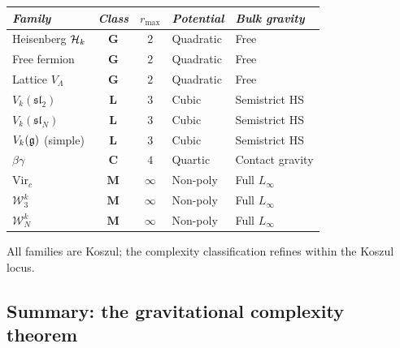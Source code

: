 \begin{theorem}
\ClaimStatusProvedHere
{}
\begin{center}
\small
\renewcommand{\arraystretch}{1.3}
\begin{tabular}{l@{\quad}c@{\quad}c@{\quad}l@{\quad}l}
\toprule
\emph{Family} & \emph{Class} & $r_{\max}$ &
 \emph{Potential} &
 \emph{Bulk gravity} \\
\midrule
Heisenberg $\mathcal{H}_k$ &
 $\mathbf{G}$ & $2$ & Quadratic & Free \\
Free fermion &
 $\mathbf{G}$ & $2$ & Quadratic & Free \\
Lattice $V_\Lambda$ &
 $\mathbf{G}$ & $2$ & Quadratic & Free \\[3pt]
$V_k(\mathfrak{sl}_2)$ &
 $\mathbf{L}$ & $3$ & Cubic & Semistrict HS \\
$V_k(\mathfrak{sl}_N)$ &
 $\mathbf{L}$ & $3$ & Cubic & Semistrict HS \\
$V_k(\mathfrak{g})$ (simple) &
 $\mathbf{L}$ & $3$ & Cubic & Semistrict HS \\[3pt]
$\beta\gamma$ &
 $\mathbf{C}$ & $4$ & Quartic & Contact gravity \\[3pt]
$\mathrm{Vir}_c$ &
 $\mathbf{M}$ & $\infty$ & Non-poly & Full $L_\infty$ \\
$\mathcal{W}_3^k$ &
 $\mathbf{M}$ & $\infty$ & Non-poly & Full $L_\infty$ \\
$\mathcal{W}_N^k$ &
 $\mathbf{M}$ & $\infty$ & Non-poly & Full $L_\infty$ \\
\bottomrule
\end{tabular}
\end{center}
All families are Koszul; the complexity classification refines
within the Koszul locus.
\end{theorem}



\subsection{Summary: the gravitational complexity theorem}

